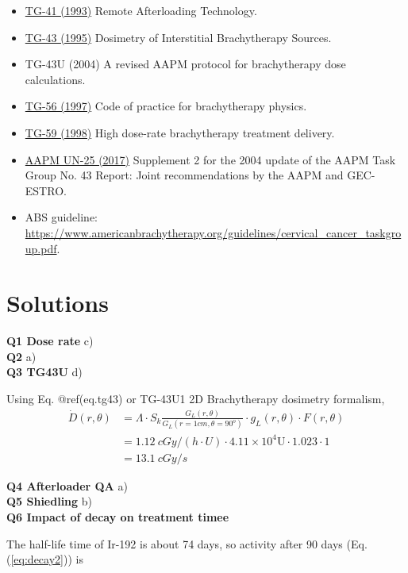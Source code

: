 \documentclass[]{book}
\providecommand{\tightlist}{%
  \setlength{\itemsep}{0pt}\setlength{\parskip}{0pt}}
\theoremstyle{definition}
\theoremstyle{definition}
\theoremstyle{definition}
\theoremstyle{remark}
\begin{document}
\begin{itemize}
\tightlist
\item
  \href{https://www.aapm.org/pubs/reports/rpt_41.pdf}{TG-41 (1993)}
  Remote Afterloading Technology.
\item
  \href{https://www.aapm.org/pubs/reports/detail.asp?docid=50}{TG-43
  (1995)} Dosimetry of Interstitial Brachytherapy Sources.
\item
  TG-43U (2004) A revised AAPM protocol for brachytherapy dose
  calculations.
\item
  \href{https://www.aapm.org/pubs/reports/detail.asp?docid=58\#}{TG-56
  (1997)} Code of practice for brachytherapy physics.
\item
  \href{https://pdfs.semanticscholar.org/5a32/c14e0720d3e5af0747e5a191845683b3feca.pdf}{TG-59
  (1998)} High dose-rate brachytherapy treatment delivery.
\item
  \href{https://www.aapm.org/pubs/reports/detail.asp?docid=167}{AAPM
  UN-25 (2017)} Supplement 2 for the 2004 update of the AAPM Task Group
  No. 43 Report: Joint recommendations by the AAPM and GEC-ESTRO.
\item
  ABS guideline:
  \url{https://www.americanbrachytherapy.org/guidelines/cervical_cancer_taskgroup.pdf}.
\end{itemize}

\section{Solutions}\label{solutions-1}

\textbf{Q1 Dose rate} c)\\
\textbf{Q2} a)\\
\textbf{Q3 TG43U } d)

Using Eq. @ref(eq.tg43) or TG-43U1 2D Brachytherapy dosimetry formalism,
\[
\begin{aligned}
   \dot D(r, \theta) &= \Lambda\cdot S_k \frac{G_L(r, \theta)}{G_L(r=1cm,\theta=90^o)} \cdot g_L(r, \theta)\cdot F(r,\theta)\\
   &=1.12\ cGy/(h\cdot U)\cdot4.11\times10^4\text{U}\cdot1.023\cdot1\\
   &=\boxed{13.1\ cGy/s}
\end{aligned}
\]

\textbf{Q4 Afterloader QA} a)\\
\textbf{Q5 Shiedling} b)\\
\textbf{Q6 Impact of decay on treatment timee}

The half-life time of Ir-192 is about 74 days, so activity after 90 days
(Eq. (\eqref{eq:decay2})) is
\end{document}
